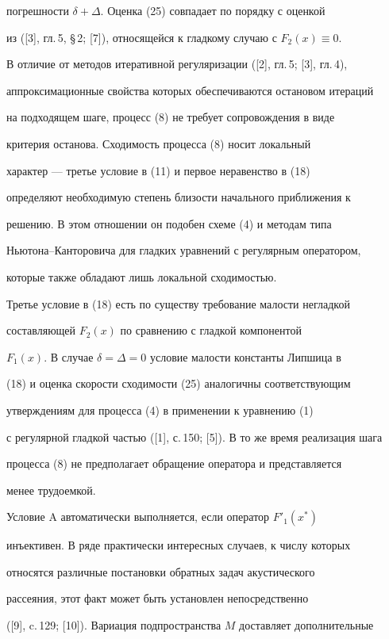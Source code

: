 погрешности $\delta+\Delta$. Оценка (25) совпадает по порядку с оценкой 


из ([3], гл.\,5, \S\,2; [7]), относящейся к гладкому случаю с $F_2(x)\equiv0$. 


В отличие от методов итеративной регуляризации ([2], гл.\,5; [3], гл.\,4), 


аппроксимационные свойства которых обеспечиваются остановом итераций 


на подходящем шаге, процесс (8) не требует сопровождения в виде 


критерия останова. Сходимость процесса (8) носит локальный 


характер --- третье условие в (11) и первое неравенство в (18) 


определяют необходимую степень близости начального приближения к 


решению. В этом отношении он подобен схеме (4) и методам типа 


Ньютона--Канторовича для гладких уравнений с регулярным оператором, 


которые также обладают лишь локальной сходимостью. 


Третье условие в (18) есть по существу требование малости негладкой 


составляющей $F_2(x)$ по сравнению с гладкой компонентой 


$F_1(x)$. В случае $\delta=\Delta=0$ условие малости константы Липшица в 


(18) и оценка скорости сходимости (25) аналогичны соответствующим 


утверждениям для процесса (4) в применении к уравнению (1) 


с регулярной гладкой частью ([1], с.\,150; [5]). В то же время реализация шага 


процесса (8) не предполагает обращение оператора и представляется 


менее трудоемкой.





Условие A автоматически выполняется, если оператор $F'_1(x^*)$ 


инъективен. В ряде практически интересных случаев, к числу которых 


относятся различные постановки обратных задач акустического 


рассеяния, этот факт может быть установлен непосредственно


([9], c.\,129; [10]). Вариация подпространства $M$ доставляет дополнительные 


